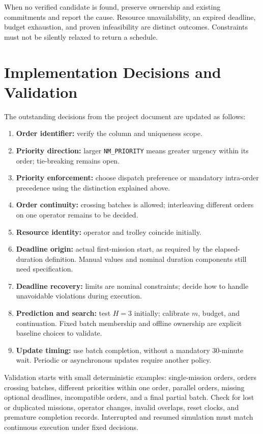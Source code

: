 When no verified candidate is found, preserve ownership and existing
commitments and report the cause. Resource unavailability, an expired
deadline, budget exhaustion, and proven infeasibility are distinct outcomes.
Constraints must not be silently relaxed to return a schedule.

\section{Implementation Decisions and Validation}

The outstanding decisions from the project document are updated as follows:
\begin{enumerate}
 \item \textbf{Order identifier:} verify the column and uniqueness scope.
 \item \textbf{Priority direction:} larger \texttt{NM\_PRIORITY} means
 greater urgency within its order; tie-breaking remains open.
 \item \textbf{Priority enforcement:} choose dispatch preference or mandatory
 intra-order precedence using the distinction explained above.
 \item \textbf{Order continuity:} crossing batches is allowed; interleaving
 different orders on one operator remains to be decided.
 \item \textbf{Resource identity:} operator and trolley coincide initially.
 \item \textbf{Deadline origin:} actual first-mission start, as required by
 the elapsed-duration definition. Manual values and nominal duration
 components still need specification.
 \item \textbf{Deadline recovery:} limits are nominal constraints; decide
 how to handle unavoidable violations during execution.
 \item \textbf{Prediction and search:} test $H=3$ initially; calibrate $m$,
 budget, and continuation. Fixed batch membership and offline ownership
 are explicit baseline choices to validate.
 \item \textbf{Update timing:} use batch completion, without a mandatory
 30-minute wait. Periodic or asynchronous updates require another policy.
\end{enumerate}

Validation starts with small deterministic examples: single-mission orders,
orders crossing batches, different priorities within one order, parallel
orders, missing optional deadlines, incompatible orders, and a final partial
batch. Check for lost or duplicated missions, operator changes, invalid
overlaps, reset clocks, and premature completion records. Interrupted and
resumed simulation must match continuous execution under fixed decisions.

